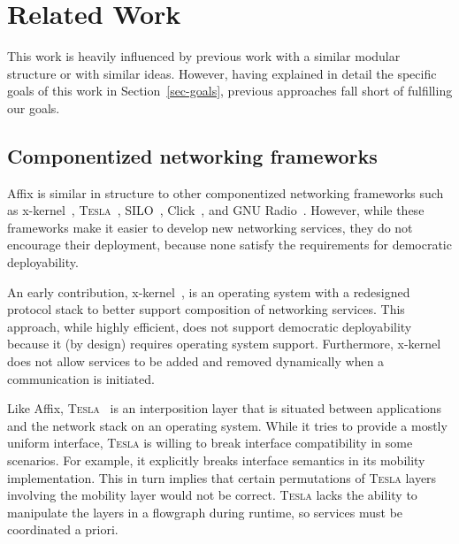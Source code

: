 \section{Related Work}
\label{sec-related}

This work is heavily influenced by previous work 
with a similar modular structure or with similar ideas.
However, having explained in detail the specific goals of this 
work in Section~\ref{sec-goals}, 
previous approaches fall short of fulfilling our goals.

\subsection{Componentized networking frameworks}

Affix is similar in structure 
to other componentized networking frameworks such as 
x-kernel~\cite{hutchinson1991x,hutchinson23rpc,peterson1990x},
\textsc{Tesla}~\cite{salz2002tesla, salz2003tesla},
SILO~\cite{dutta2007silo, baldine2007unified},
Click~\cite{Fu_TOCS_2002},
and GNU Radio~\cite{blossom2004gnu}.
However, while these frameworks make
it easier to develop new networking services, 
they do not encourage their deployment,
because none satisfy the requirements for 
democratic deployability.

An early contribution, 
x-kernel~\cite{hutchinson1991x,hutchinson23rpc,peterson1990x},
is an operating system with a redesigned protocol stack 
to better support composition of networking services.
This approach, while highly efficient, does not support 
democratic deployability because it (by design) requires operating system 
support. Furthermore, x-kernel does not allow services to be 
added and removed dynamically when a communication is initiated.
  
Like Affix, \textsc{Tesla}~\cite{salz2002tesla, salz2003tesla} 
is an interposition layer that is situated 
between applications and the network 
stack on an operating system.
While it tries to provide a mostly uniform 
interface, \textsc{Tesla} is willing to break interface compatibility 
in some scenarios. For example, it explicitly breaks 
interface semantics in its mobility implementation. This 
in turn implies that certain permutations of \textsc{Tesla} layers 
involving the mobility layer would not be correct. 
\textsc{Tesla} lacks the ability to manipulate the layers in a 
flowgraph during runtime, so services must be coordinated
a priori.

